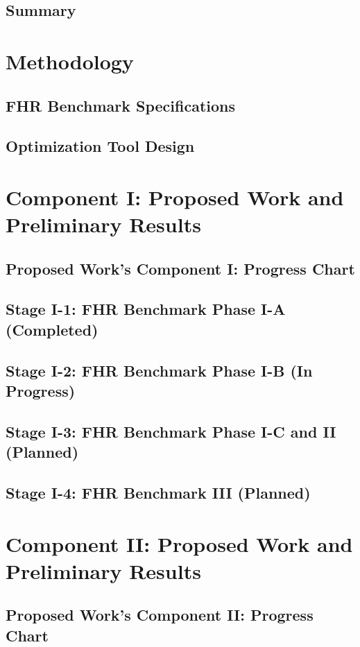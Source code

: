 \documentclass[9pt]{beamer}
\begin{document}
\subsection{Summary}


\section{Methodology}
\subsection{FHR Benchmark Specifications}

\subsection{Optimization Tool Design}


\section{Component I: Proposed Work and Preliminary Results}
\subsection{Proposed Work's Component I: Progress Chart}

\subsection{Stage I-1: FHR Benchmark Phase I-A (Completed)}

\subsection{Stage I-2: FHR Benchmark Phase I-B (In Progress)}

\subsection{Stage I-3: FHR Benchmark Phase I-C and II (Planned)}

\subsection{Stage I-4: FHR Benchmark III (Planned)}


\section{Component II: Proposed Work and Preliminary Results}
\subsection{Proposed Work's Component II: Progress Chart}

\end{document}
